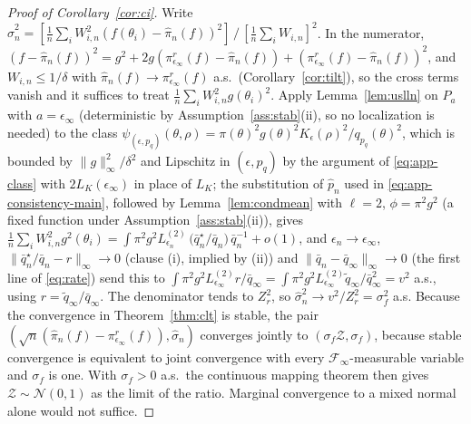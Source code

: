 \documentclass[10pt]{article}
\theoremstyle{plain}
\theoremstyle{definition}
\begin{document}
\begin{proof}[Proof of Corollary~\ref{cor:ci}]
Write $\widehat\sigma^2_n=[\tfrac1n\sum_iW^2_{i,n}(f(\theta_i)-\widehat\pi_n(f))^2]\,/\,[\tfrac1n\sum_iW_{i,n}]^2$. In the numerator, $(f-\widehat\pi_n(f))^2=g^2+2g(\pi^r_{\epsilon_\infty}(f)-\widehat\pi_n(f))+(\pi^r_{\epsilon_\infty}(f)-\widehat\pi_n(f))^2$, and $W_{i,n}\le1/\delta$ with $\widehat\pi_n(f)\to\pi^r_{\epsilon_\infty}(f)$ a.s.\ (Corollary~\ref{cor:tilt}), so the cross terms vanish and it suffices to treat $\tfrac1n\sum_iW^2_{i,n}g(\theta_i)^2$. Apply Lemma~\ref{lem:uslln} on $P_{a}$ with $a=\epsilon_\infty$ (deterministic by Assumption~\ref{ass:stab}(ii), so no localization is needed) to the class $\psi_{(\epsilon,p_q)}(\theta,\rho)=\pi(\theta)^2g(\theta)^2K_\epsilon(\rho)^2/q_{p_q}(\theta)^2$, which is bounded by $\|g\|^2_\infty/\delta^2$ and Lipschitz in $(\epsilon,p_q)$ by the argument of \eqref{eq:app-class} with $2L_K(\epsilon_\infty)$ in place of $L_K$; the substitution of $\widehat p_n$ used in \eqref{eq:app-consistency-main}, followed by Lemma~\ref{lem:condmean} with $\ell=2$, $\phi=\pi^2g^2$ (a fixed function under Assumption~\ref{ass:stab}(ii)), gives
$\tfrac1n\sum_iW^2_{i,n}g^2(\theta_i)=\int\pi^2g^2L^{(2)}_{\epsilon_n}\,\bigl(\bar q^\star_n/\bar q_n\bigr)\,\bar q_n^{-1}+o(1)$,
and $\epsilon_n\to\epsilon_\infty$, $\|\bar q^\star_n/\bar q_n-r\|_\infty\to0$ (clause (i), implied by (ii)) and $\|\bar q_n-\bar q_\infty\|_\infty\to0$ (the first line of \eqref{eq:rate}) send this to $\int\pi^2g^2L^{(2)}_{\epsilon_\infty}r/\bar q_\infty=\int\pi^2g^2L^{(2)}_{\epsilon_\infty}\tilde q_\infty/\bar q^2_\infty=v^2$ a.s., using $r=\tilde q_\infty/\bar q_\infty$. The denominator tends to $Z^2_r$, so $\widehat\sigma^2_n\to v^2/Z^2_r=\sigma^2_f$ a.s. Because the convergence in Theorem~\ref{thm:clt} is stable, the pair $(\sqrt n(\widehat\pi_n(f)-\pi^r_{\epsilon_\infty}(f)),\widehat\sigma_n)$ converges jointly to $(\sigma_f\mathcal{Z},\sigma_f)$, because stable convergence is equivalent to joint convergence with every $\mathcal{F}_\infty$-measurable variable and $\sigma_f$ is one. With $\sigma_f>0$ a.s.\ the continuous mapping theorem then gives $\mathcal{Z}\sim\mathcal{N}(0,1)$ as the limit of the ratio. Marginal convergence to a mixed normal alone would not suffice.
\end{proof}
\end{document}
